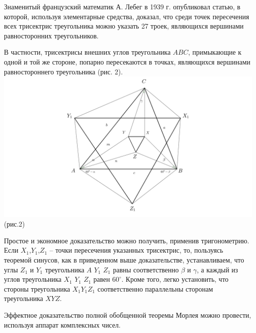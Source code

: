 \documentclass{article}
\begin{document}
\par Знаменитый французский математик А. Лебег в 1939 г. опубликовал статью, в которой, используя элементарные средства, доказал, что среди точек пересечения всех трисектрис треугольника можно указать 27 троек, являющихся вершинами равносторонних треугольников. 
\par В частности, трисектрисы внешних углов треугольника $ABC$, примыкающие к одной и той же стороне, попарно пересекаются в точках, являющихся вершинами равностороннего треугольника (рис. 2).
\\
\includegraphics[scale=0.25]{morley2.png}(рис.2)
\par Простое и экономное доказательство можно получить, применив тригонометрию. Если $X_1$,$Y_1$,$Z_1$ -- точки пересечения указанных трисектрис, то, пользуясь теоремой синусов, как в приведенном выше доказательстве, устанавливаем, что углы $Z_1$ и $Y_1$ треугольника $A$ $Y_1$ $Z_1$ равны соответственно $\beta$ и $\gamma$, а каждый из углов треугольника $X_1$ $Y_1$ $Z_1$ равен $60^{\circ}$. Кроме того, легко установить, что стороны треугольника $X_1$$Y_1$$Z_1$ соответственно параллельны сторонам треугольника $XYZ$. 
\par Эффектное доказательство полной обобщенной теоремы Морлея можно провести, используя аппарат комплексных чисел.
\end{document}
